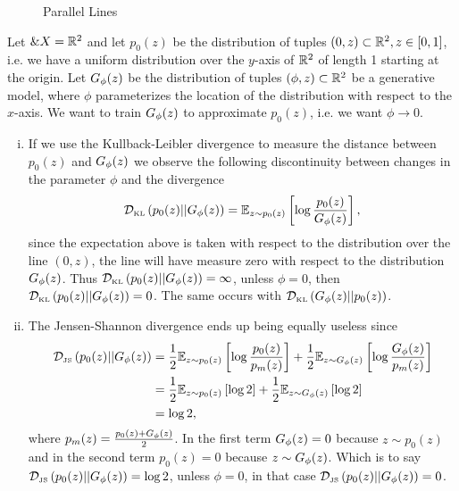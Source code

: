 \begin{example}
  \begin{figure}[h] \centering
    \caption{Parallel Lines}
    \label{fig:parallel-lines}
  \end{figure}
  \label{example:learning-parallel-lines}

  Let $\&X = \mathbb{R}^2$ and let $p_0(z)$ be the distribution of tuples
  $(0, z) \subset \mathbb{R}^2, z \in [0, 1]$, i.e. we have a uniform
  distribution over the $y$-axis of $\mathbb{R}^2$ of length 1 starting at the
  origin. Let $G_\phi(z)$ be the distribution of tuples
  $(\phi, z) \subset \mathbb{R}^2$ be a generative model, where $\phi$
  parameterizes the location of the distribution with respect to the
  $x$-axis. We want to train $G_\phi(z)$ to approximate $p_0(z)$, i.e. we
  want $\phi \to 0$.
  \begin{enumerate}[(i)]
  \item If we use the Kullback-Leibler divergence to measure the
    distance between $p_0(z)$ and $G_\phi(z)$ we observe the following
    discontinuity between changes in the parameter $\phi$ and the
    divergence
    \begin{align}
      \mathcal{D}_{\text{\tiny KL}}\left( p_0(z) \middle| \middle| G_\phi(z) \right) = \mathbb{E}_{z \sim p_0(z)}\left[ \log{p_0(z)\over G_\phi(z)} \right],
    \end{align}
    since the expectation above is taken with respect to the
    distribution over the line $(0, z)$, the line will have measure
    zero with respect to the distribution $G_\phi(z)$. Thus
    $\mathcal{D}_{\text{\tiny KL}}\left( p_0(z) \middle| \middle| G_\phi(z) \right) = \infty$, unless $\phi = 0$, then
    $\mathcal{D}_{\text{\tiny KL}}\left( p_0(z) \middle| \middle| G_\phi(z) \right) = 0$. The same occurs with
    $\mathcal{D}_{\text{\tiny KL}}\left( G_\phi(z) \middle| \middle| p_0(z) \right)$.
  \item The Jensen-Shannon divergence ends up being equally useless
    since
    \begin{align}
      \mathcal{D}_{\text{\tiny JS}}\left(p_0(z)\middle|\middle|G_\phi(z)\right) & = {1 \over 2} \mathbb{E}_{z \sim p_0(z)}\left[ \log{p_0(z)
                            \over p_m(z)} \right] + {1 \over 2} \mathbb{E}_{z \sim
                            G_\phi(z)}\left[ \log{G_\phi(z) \over p_m(z)} \right] \\
                          & = {1 \over 2} \mathbb{E}_{z \sim p_0(z)}\left[ \log{2} \right] + {1
                            \over 2} \mathbb{E}_{z \sim G_\phi(z)}\left[ \log{2} \right] \\
                          & = \log{2},
    \end{align}
    where $p_m(z) = {p_0(z) + G_\phi(z) \over 2}$. In the first term
    $G_\phi(z) = 0$ because $z \sim p_0(z)$ and in the second term
    $p_0(z) = 0$ because $z \sim G_\phi(z)$. Which is to say
    $\mathcal{D}_{\text{\tiny JS}}\left(p_0(z)\middle|\middle|G_\phi(z)\right) = \log{2}$, unless $\phi = 0$, in that case
    $\mathcal{D}_{\text{\tiny JS}}\left(p_0(z)\middle|\middle|G_\phi(z)\right) = 0$.
  \end{enumerate}
\end{example}

